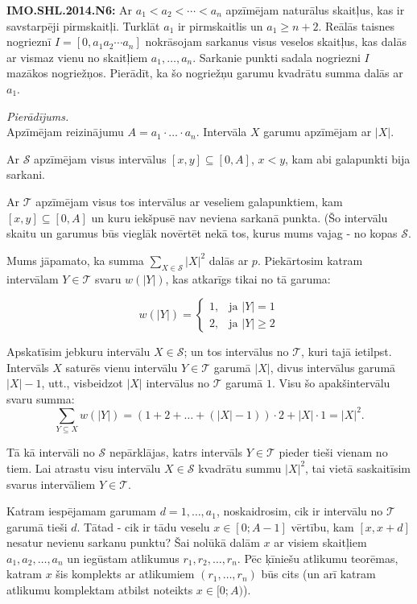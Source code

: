 \documentclass[11pt]{article}
\newenvironment{uzdevums}[1][\unskip]{%
\vspace{3mm}
\noindent
\textbf{#1:}
\noindent}
{}
\begin{document}
\thispagestyle{empty}

\begin{uzdevums}[IMO.SHL.2014.N6]
Ar $a_1 < a_2 <  \cdots <a_n$ apzīmējam naturālus skaitļus, kas ir 
savstarpēji pirmskaitļi. Turklāt $a_1$ ir pirmskaitlis un
$a_1 \geq n + 2$. Reālās taisnes nogrieznī 
$I = [0, a_1 a_2  \cdots a_n ]$ 
nokrāsojam sarkanus visus veselos skaitļus, kas dalās ar vismaz vienu no 
skaitļiem
$a_1, \ldots, a_n$. Sarkanie punkti sadala nogriezni $I$ mazākos nogriežņos.
Pierādīt, ka šo nogriežņu garumu kvadrātu summa dalās ar $a_1$. 
\end{uzdevums}

{\em Pierādījums.} \\
Apzīmējam reizinājumu $A=a_1\cdot\ldots\cdot{}a_n$. 
Intervāla $X$ garumu apzīmējam ar $|X|$.

Ar $\mathcal{S}$ apzīmējam visus intervālus 
$[x,y] \subseteq [0,A]$, $x < y$, kam abi galapunkti 
bija sarkani.

Ar $\mathcal{T}$ apzīmējam visus  
tos intervālus ar veseliem galapunktiem, kam $[x,y] \subseteq [0,A]$
un kuru iekšpusē nav neviena sarkanā punkta. (Šo intervālu skaitu un garumus
būs vieglāk novērtēt nekā tos, kurus mums vajag - no kopas $\mathcal{S}$.

Mums jāpamato, ka summa ${\displaystyle \sum_{X \in \mathcal{S}} |X|^2}$ 
dalās ar $p$. Piekārtosim katram intervālam $Y \in \mathcal{T}$ svaru
$w(|Y|)$, kas atkarīgs tikai no tā garuma:

$$w(|Y|) = \left\{
\begin{array}{ll}
1, & \mbox{ja $|Y| = 1$} \\
2, & \mbox{ja $|Y| \geq 2$}
\end{array} \right.$$

Apskatīsim jebkuru intervālu $X \in \mathcal{S}$; un tos intervālus 
no $\mathcal{T}$, kuri tajā ietilpst. Intervāls $X$ saturēs vienu
intervālu $Y \in \mathcal{T}$ garumā $|X|$, divus intervālus garumā
$|X|-1$, utt., visbeidzot $|X|$ intervālus no $\mathcal{T}$ garumā $1$. 
Visu šo apakšintervālu svaru summa:
$$\sum_{Y \subseteq X} w(|Y|) = (1+2+\ldots+(|X|-1))\cdot 2 + |X| \cdot 1 = |X|^2.$$

Tā kā intervāli no $\mathcal{S}$ nepārklājas, katrs intervāls $Y \in \mathcal{T}$
pieder tieši vienam no tiem. Lai atrastu visu intervālu $X \in  \mathcal{S}$ kvadrātu summu $|X|^2$, 
tai vietā saskaitīsim svarus intervāliem $Y \in \mathcal{T}$. 

Katram iespējamam garumam $d = 1,\ldots,a_1$, noskaidrosim, cik ir intervālu no $\mathcal{T}$ garumā
tieši $d$. Tātad - cik ir tādu veselu $x \in [0;A-1]$ vērtību, kam $[x,x+d]$ nesatur nevienu sarkanu punktu?
Šai nolūkā dalām $x$ ar visiem skaitļiem $a_1,a_2,\ldots,a_n$ un iegūstam atlikumus $r_1,r_2,\ldots,r_n$. 
Pēc ķīniešu atlikumu teorēmas, katram $x$ šis komplekts ar atlikumiem $(r_1,\ldots,r_n)$ būs cits 
(un arī katram atlikumu komplektam atbilst noteikts $x \in [0;A)$). 
\end{document}
